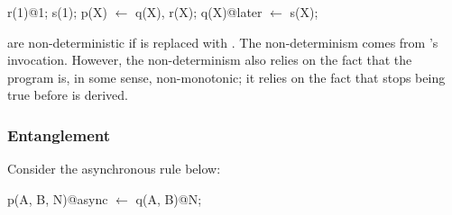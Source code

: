 \begin{Dedalus}
r(1)@1;
s(1);
p(X) \(\leftarrow\) q(X), r(X);
q(X)@later \(\leftarrow\) s(X);
\end{Dedalus}
are non-deterministic if  is replaced with
.  
The non-determinism comes from 's
 invocation.  However, the non-determinism also relies
on the fact that the program is, in some sense, non-monotonic; it
relies on the fact that  stops being true before
 is derived.










\subsubsection{Entanglement}

Consider the asynchronous rule below:

\begin{Dedalus}
p(A, B, N)@async \(\leftarrow\)
  q(A, B)@N;
\end{Dedalus}

